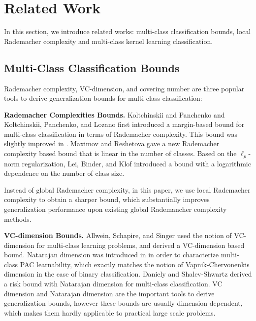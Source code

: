 \documentclass{article}
\begin{document}
\section{Related Work}
In this section,
we  introduce related works:
multi-class classification bounds,
local Rademacher complexity and multi-class kernel learning classification.

\subsection{Multi-Class Classification Bounds}
 Rademacher complexity, VC-dimension, and covering number are three
 popular tools to derive generalization bounds for multi-class classification:

\textbf{Rademacher Complexities Bounds.}
   Koltchinskii and Panchenko 
    and Koltchinskii, Panchenko, and Lozano 
    first introduced a margin-based bound for multi-class classification in terms of Rademacher complexity.
    This bound was slightly improved in \cite{mohri2012foundations,cortes2013multi}.
    Maximov and Reshetova  gave a new Rademacher complexity based bound
    that is linear in the number of classes.
    Based on the $\ell_p$-norm regularization,
    Lei, Binder, and Klof  introduced a bound
    with a logarithmic dependence on the number of class size.

    Instead of global Rademacher complexity,
    in this paper, we use local Rademacher complexity
    to obtain a sharper bound, which  substantially improves
    generalization performance upon existing global Rademancher complexity methods.

\textbf{VC-dimension Bounds.}
    Allwein, Schapire, and Singer   used the notion of VC-dimension
    for multi-class learning problems,
    and derived a VC-dimension based bound.
    Natarajan dimension was introduced in \cite{Natarajan1989} in
    order to characterize multi-class PAC learnability,
    which exactly matches the notion of Vapnik-Chervonenkis
    dimension in the case of binary classification.
    Daniely and Shalev-Shwartz  derived a risk bound with Natarajan dimension for multi-class classification.
    VC dimension and Natarajan dimension are the important tools to derive generalization bounds,
    however these bounds are usually dimension
    dependent, which makes them hardly applicable to practical large
    scale problems.
\end{document}
